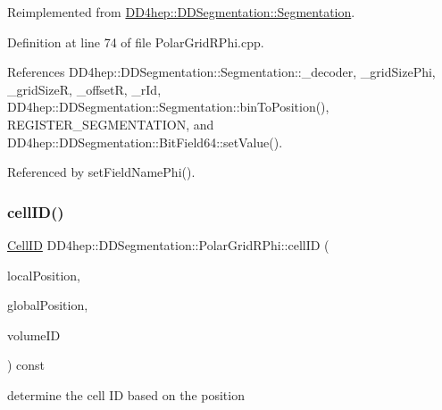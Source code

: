 Reimplemented from \hyperlink{class_d_d4hep_1_1_d_d_segmentation_1_1_segmentation_ac2119ba64c9805751e08b6100ef6fee6}{D\+D4hep\+::\+D\+D\+Segmentation\+::\+Segmentation}.



Definition at line 74 of file Polar\+Grid\+R\+Phi.\+cpp.



References D\+D4hep\+::\+D\+D\+Segmentation\+::\+Segmentation\+::\+\_\+decoder, \+\_\+grid\+Size\+Phi, \+\_\+grid\+SizeR, \+\_\+offsetR, \+\_\+r\+Id, D\+D4hep\+::\+D\+D\+Segmentation\+::\+Segmentation\+::bin\+To\+Position(), R\+E\+G\+I\+S\+T\+E\+R\+\_\+\+S\+E\+G\+M\+E\+N\+T\+A\+T\+I\+ON, and D\+D4hep\+::\+D\+D\+Segmentation\+::\+Bit\+Field64\+::set\+Value().



Referenced by set\+Field\+Name\+Phi().

\hypertarget{class_d_d4hep_1_1_d_d_segmentation_1_1_polar_grid_r_phi_a09c10a43f4364403515057ffb5a56f4e}{}\label{class_d_d4hep_1_1_d_d_segmentation_1_1_polar_grid_r_phi_a09c10a43f4364403515057ffb5a56f4e} 
\subsubsection{\texorpdfstring{cell\+I\+D()}{cellID()}}
{\footnotesize\ttfamily \hyperlink{namespace_d_d4hep_1_1_d_d_segmentation_ac7af071d85cb48820914434a07e21ba1}{Cell\+ID} D\+D4hep\+::\+D\+D\+Segmentation\+::\+Polar\+Grid\+R\+Phi\+::cell\+ID (\begin{DoxyParamCaption}\item[{const \hyperlink{struct_d_d4hep_1_1_d_d_segmentation_1_1_vector3_d}{Vector3D} \&}]{local\+Position,  }\item[{const \hyperlink{struct_d_d4hep_1_1_d_d_segmentation_1_1_vector3_d}{Vector3D} \&}]{global\+Position,  }\item[{const \hyperlink{namespace_d_d4hep_1_1_d_d_segmentation_a61a6833a18d1800bdef176595f83e3ba}{Volume\+ID} \&}]{volume\+ID }\end{DoxyParamCaption}) const\hspace{0.3cm}{\ttfamily [virtual]}}



determine the cell ID based on the position 




